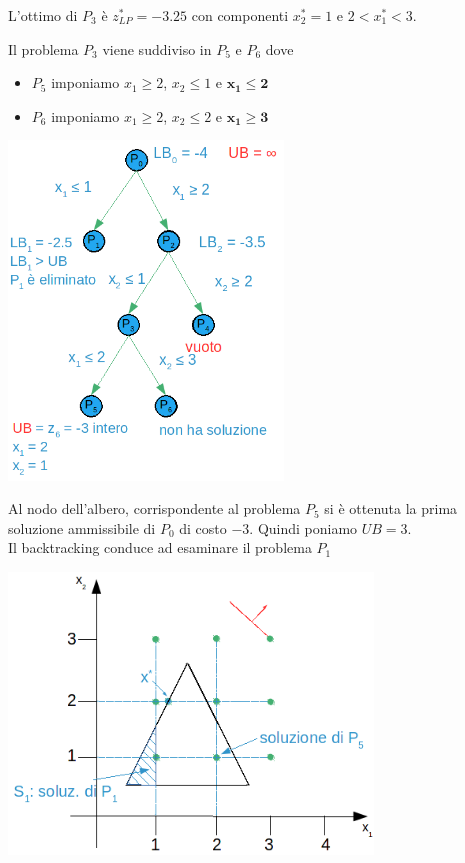 L'ottimo di $P_{3}$ è $z_{LP}^{*}=-3.25$ con componenti $x_{2}^{*}=1$ e $2 < x_{1}^{*} < 3$.

Il problema $P_{3}$ viene suddiviso in $P_{5}$ e $P_{6}$ dove
\begin{itemize}
	\item $P_{5}$ imponiamo $x_{1}\ge 2$, $x_{2}\le 1$ e \underline{$\boldsymbol{x_{1}\le 2}$}
	\item $P_{6}$ imponiamo $x_{1}\ge 2$, $x_{2}\le 2$ e \underline{$\boldsymbol{x_{1}\ge 3}$}
\end{itemize}

\centerline{\includegraphics[height=9cm]{images/graph24.png}}

Al nodo dell'albero, corrispondente al problema $P_{5}$ si è ottenuta la prima soluzione ammissibile di $P_{0}$ di costo $-3$. Quindi poniamo \textbf{$UB = 3$}.\\
Il backtracking conduce ad esaminare il problema $P_{1}$

\centerline{\includegraphics[height=7.5cm]{images/graph25.png}}

